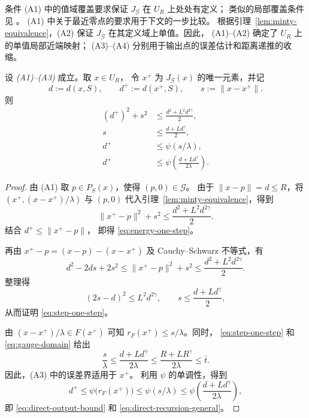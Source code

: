 条件 (A1) 中的值域覆盖要求保证
$J_{\mathcal G}$ 在 $U_R$ 上处处有定义；
类似的局部覆盖条件见
\cite[Assumption~2(d)(ii)]{LukeTam2025GeneralizedMonotonicity}。
(A1) 中关于最近零点的要求用于下文的一步比较。
根据引理~\ref{lem:minty-equivalence}，(A2) 保证
$J_{\mathcal G}$ 在其定义域上单值。因此，
(A1)--(A2) 确定了 $U_R$ 上的单值局部近端映射；
(A3)--(A4) 分别用于输出点的误差估计和距离递推的收缩。

\begin{lemma}
\label{lem:solution-comparison}
设 \emph{(A1)--(A3)} 成立。取 $x\in U_R$，
令 $x^+$ 为 $J_{\mathcal G}(x)$ 的唯一元素，并记
\[
 d:=d(x,S),\qquad
 d^+:=d(x^+,S),\qquad
 s:=\|x-x^+\|.
\]
则
\begin{align}
\label{eq:energy-one-step}
 (d^+)^2+s^2
 &\leq\frac{d^2+L^2d^{2\gamma}}2,\\
\label{eq:step-one-step}
 s&\leq\frac{d+Ld^\gamma}{2},\\
\label{eq:direct-output-bound}
 d^+&\leq\psi(s/\lambda),\\
\label{eq:direct-recursion-general}
 d^+&\leq
 \psi\!\left(\frac{d+Ld^\gamma}{2\lambda}\right).
\end{align}
\end{lemma}

\begin{proof}
由 (A1) 取 $p\in P_S(x)$，使得 $(p,0)\in\mathcal G$。
由于 $\|x-p\|=d\leq R$，将
$(x^+,(x-x^+)/\lambda)$ 与 $(p,0)$
代入引理~\ref{lem:minty-equivalence}，得到
\[
 \|x^+-p\|^2+s^2
 \leq\frac{d^2+L^2d^{2\gamma}}2.
\]
结合 $d^+\leq\|x^+-p\|$，
即得 \eqref{eq:energy-one-step}。

再由 $x^+-p=(x-p)-(x-x^+)$
及 Cauchy--Schwarz 不等式，有
\[
 d^2-2ds+2s^2
 \leq\|x^+-p\|^2+s^2
 \leq\frac{d^2+L^2d^{2\gamma}}2.
\]
整理得
\begin{equation}
\label{eq:power-step}
 (2s-d)^2\leq L^2d^{2\gamma},
 \qquad
 s\leq\frac{d+Ld^\gamma}{2},
\end{equation}
从而证明 \eqref{eq:step-one-step}。

由 $(x-x^+)/\lambda\in F(x^+)$ 可知
$r_F(x^+)\leq s/\lambda$。同时，
\eqref{eq:step-one-step} 和
\eqref{eq:gauge-domain} 给出
\[
 \frac{s}{\lambda}
 \leq\frac{d+Ld^\gamma}{2\lambda}
 \leq\frac{R+LR^\gamma}{2\lambda}
 \leq\bar t.
\]
因此，(A3) 中的误差界适用于 $x^+$。
利用 $\psi$ 的单调性，得到
\[
 d^+\leq\psi\bigl(r_F(x^+)\bigr)
 \leq\psi(s/\lambda)
 \leq
 \psi\!\left(\frac{d+Ld^\gamma}{2\lambda}\right),
\]
即 \eqref{eq:direct-output-bound} 和
\eqref{eq:direct-recursion-general}。
\end{proof}

